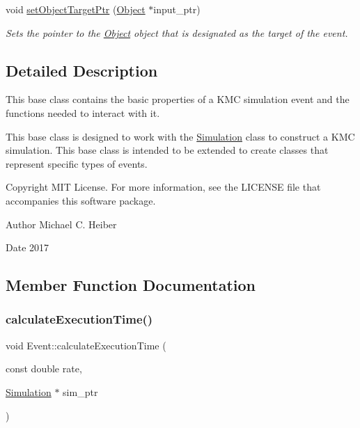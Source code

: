 \begin{DoxyCompactItemize}
void \hyperlink{class_event_a2e868dc951b6fec86703dcd7776680e0}{set\+Object\+Target\+Ptr} (\hyperlink{class_object}{Object} $\ast$input\+\_\+ptr)
\begin{DoxyCompactList}\small\item\em Sets the pointer to the \hyperlink{class_object}{Object} object that is designated as the target of the event. \end{DoxyCompactList}\end{DoxyCompactItemize}


\subsection{Detailed Description}
This base class contains the basic properties of a K\+MC simulation event and the functions needed to interact with it. 

This base class is designed to work with the \hyperlink{class_simulation}{Simulation} class to construct a K\+MC simulation. This base class is intended to be extended to create classes that represent specific types of events. \begin{DoxyCopyright}{Copyright}
M\+IT License. For more information, see the L\+I\+C\+E\+N\+SE file that accompanies this software package. 
\end{DoxyCopyright}
\begin{DoxyAuthor}{Author}
Michael C. Heiber 
\end{DoxyAuthor}
\begin{DoxyDate}{Date}
2017 
\end{DoxyDate}


\subsection{Member Function Documentation}
\mbox{\label{class_event_a14b3f90f4b4d72ab1d0bf70f9b4cc907}} 
\subsubsection{\texorpdfstring{calculate\+Execution\+Time()}{calculateExecutionTime()}}
{\footnotesize\ttfamily void Event\+::calculate\+Execution\+Time (\begin{DoxyParamCaption}\item[{const double}]{rate,  }\item[{\hyperlink{class_simulation}{Simulation} $\ast$}]{sim\+\_\+ptr }\end{DoxyParamCaption})}



